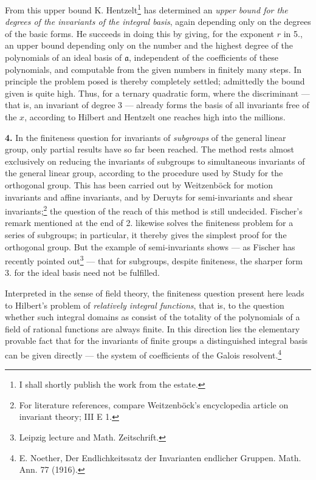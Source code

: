 \documentclass[11pt]{article}
\providecommand{\ma}{\mathfrak a}
\begin{document}
From this upper bound K. Hentzelt\footnote{I shall shortly publish the work from the estate.} has determined an \emph{upper bound for the degrees of the invariants of the integral basis}, again depending only on the degrees of the basic forms. He succeeds in doing this by giving, for the exponent $r$ in 5., an upper bound depending only on the number and the highest degree of the polynomials of an ideal basis of $\ma$, independent of the coefficients of these polynomials, and computable from the given numbers in finitely many steps. In principle the problem posed is thereby completely settled; admittedly the bound given is quite high. Thus, for a ternary quadratic form, where the discriminant --- that is, an invariant of degree 3 --- already forms the basis of all invariants free of the $x$, according to Hilbert and Hentzelt one reaches high into the millions.

\textbf{4.} In the finiteness question for invariants of \emph{subgroups} of the general linear group, only partial results have so far been reached. The method rests almost exclusively on reducing the invariants of subgroups to simultaneous invariants of the general linear group, according to the procedure used by Study for the orthogonal group. This has been carried out by Weitzenböck for motion invariants and affine invariants, and by Deruyts for semi-invariants and shear invariants;\footnote{For literature references, compare Weitzenböck's encyclopedia article on invariant theory; III E 1.} the question of the reach of this method is still undecided. Fischer's remark mentioned at the end of 2. likewise solves the finiteness problem for a series of subgroups; in particular, it thereby gives the simplest proof for the orthogonal group. But the example of semi-invariants shows --- as Fischer has recently pointed out\footnote{Leipzig lecture and Math. Zeitschrift.} --- that for subgroups, despite finiteness, the sharper form 3. for the ideal basis need not be fulfilled.

Interpreted in the sense of field theory, the finiteness question present here leads to Hilbert's problem of \emph{relatively integral functions}, that is, to the question whether such integral domains as consist of the totality of the polynomials of a field of rational functions are always finite. In this direction lies the elementary provable fact that for the invariants of finite groups a distinguished integral basis can be given directly --- the system of coefficients of the Galois resolvent.\footnote{E. Noether, Der Endlichkeitssatz der Invarianten endlicher Gruppen. Math. Ann. 77 (1916).}
\end{document}
